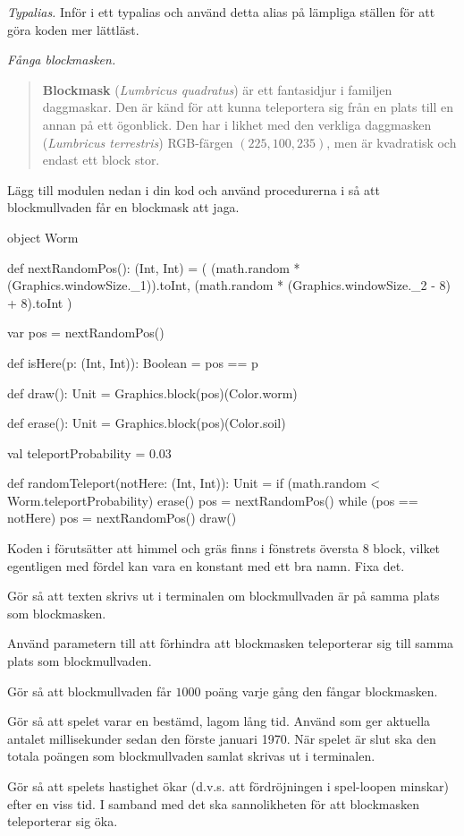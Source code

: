 \Task \emph{Typalias.} Inför i  ett typalias  och använd detta alias på lämpliga ställen för att göra koden mer lättläst.


\Task \emph{Fånga blockmasken.}

\begin{quote}
  \noindent\textbf{Blockmask} (\textit{Lumbricus quadratus}) är ett fantasidjur i familjen daggmaskar. Den är känd för att kunna teleportera sig från en plats till en annan på ett ögonblick. Den har i likhet med den verkliga daggmasken (\emph{Lumbricus terrestris}) RGB-färgen $(225, 100, 235)$, men är kvadratisk och endast ett block stor.
\end{quote}




\Subtask Lägg till modulen  nedan i din kod och använd procedurerna i  så att blockmullvaden får en blockmask att jaga.

\begin{Code}
object Worm {
  def nextRandomPos(): (Int, Int) =
    ( (math.random * (Graphics.windowSize._1)).toInt,
      (math.random * (Graphics.windowSize._2 - 8) + 8).toInt )

  var pos = nextRandomPos()

  def isHere(p: (Int, Int)): Boolean = pos == p

  def draw(): Unit  = Graphics.block(pos)(Color.worm)

  def erase(): Unit = Graphics.block(pos)(Color.soil)

  val teleportProbability = 0.03

  def randomTeleport(notHere: (Int, Int)): Unit =
    if (math.random < Worm.teleportProbability) {
      erase()
      pos = nextRandomPos()
      while (pos == notHere) pos = nextRandomPos()
      draw()
    }
}
\end{Code}

\Subtask Koden i  förutsätter att himmel och gräs finns i fönstrets översta $8$ block, vilket egentligen med fördel kan vara en konstant med ett bra namn. Fixa  det.

\Subtask Gör så att texten  skrivs ut i terminalen om blockmullvaden är på samma plats som blockmasken.

\Subtask Använd parametern  till att förhindra att blockmasken teleporterar sig till samma plats som blockmullvaden.

\Subtask Gör så att blockmullvaden får $1000$ poäng varje gång den fångar blockmasken.

\Subtask Gör så att spelet varar en bestämd, lagom lång tid. Använd  som ger aktuella antalet millisekunder sedan den förste januari 1970. När spelet är slut ska den totala poängen som blockmullvaden samlat skrivas ut i terminalen.

\Subtask Gör så att spelets hastighet ökar (d.v.s. att fördröjningen i spel-loopen minskar) efter en viss tid. I samband med det ska sannolikheten för att blockmasken teleporterar sig öka.
